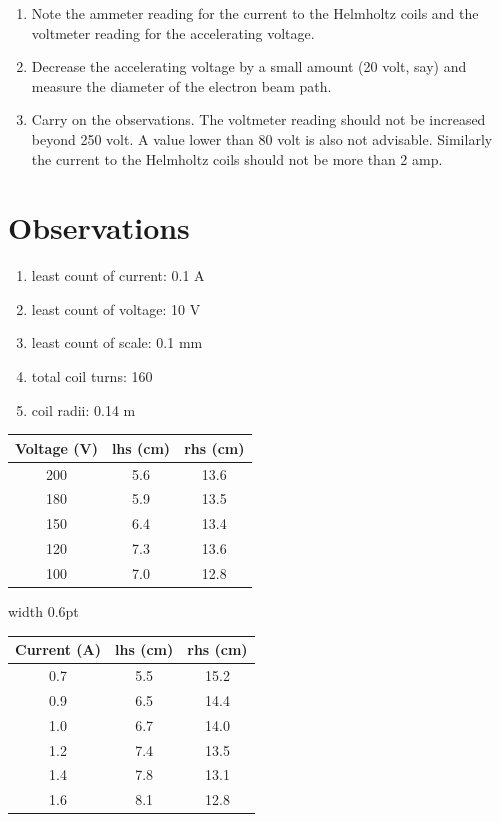 \documentclass[%
sor,
 jor,
 amsmath,amssymb,
 reprint,
]{revtex4-2}
\begin{document}
\begin{enumerate}
\item Note the ammeter reading for the current to the Helmholtz coils and the voltmeter reading for the accelerating voltage.

\item Decrease the accelerating voltage by a small amount (20 volt, say) and measure the diameter of the electron beam path.

\item Carry on the observations. The voltmeter reading should not be increased beyond 250 volt. A value lower than 80 volt is also not advisable. Similarly the current to the Helmholtz coils should not be more than 2 amp.

\end{enumerate}


\section{Observations}

\begin{enumerate}
	\item least count of current: 0.1 A 
	\item least count of voltage: 10 V
	\item least count of scale: 0.1 mm 
	\item total coil turns: 160
	\item coil radii: 0.14 m
\end{enumerate}



\begin{minipage}[t]{0.48\linewidth}
\centering
{}
\begin{tabular}{|c|c|c|}
\hline
Voltage (V) & lhs (cm) & rhs (cm) \\
\hline
200 & 5.6 & 13.6 \\
180 & 5.9 & 13.5 \\
150 & 6.4 & 13.4 \\
120 & 7.3 & 13.6 \\
100 & 7.0 & 12.8 \\
\hline
\end{tabular}
\end{minipage}%
\hspace{0.01\linewidth}%
\vrule width 0.6pt
\hspace{0.01\linewidth}%
\begin{minipage}[t]{0.48\linewidth}
\centering
{}
\begin{tabular}{|c|c|c|}
\hline
Current (A) & lhs (cm) & rhs (cm) \\
\hline
0.7 & 5.5 & 15.2 \\
0.9 & 6.5 & 14.4 \\
1.0 & 6.7 & 14.0 \\
1.2 & 7.4 & 13.5 \\
1.4 & 7.8 & 13.1 \\
1.6 & 8.1 & 12.8 \\
\hline
\end{tabular}
\end{minipage}
\end{document}
